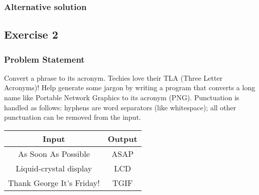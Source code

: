 \documentclass{report}
\begin{document}
    \bigbreak \noindent 
    \subsubsection{Alternative solution}
    \bigbreak \noindent 

    \pagebreak 
    \subsection{Exercise 2}
    \bigbreak \noindent 
    \subsubsection{Problem Statement}
    \bigbreak \noindent 
    Convert a phrase to its acronym.
    \bigbreak \noindent 
    Techies love their TLA (Three Letter Acronyms)!
    \bigbreak \noindent 
    Help generate some jargon by writing a program that converts a long name like Portable Network Graphics to its acronym (PNG).
    \bigbreak \noindent 
    Punctuation is handled as follows: hyphens are word separators (like whitespace); all other punctuation can be removed from the input.
    \bigbreak \noindent 
    \begin{center}
        \begin{tabular}{c|c}
            Input	&Output \\
            \hline
            As Soon As Possible	& ASAP \\
            Liquid-crystal display	& LCD \\
            Thank George It's Friday!	&TGIF \\
        \end{tabular}
    \end{center}
\end{document}
